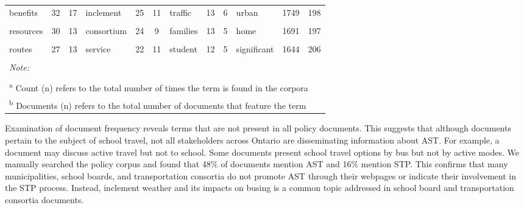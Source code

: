 \documentclass[]{elsarticle} %
\begin{document}
\begin{table}
{\begin{tabular}[t]{lcclcclcclcc}
benefits & 32 & 17 & inclement & 25 & 11 & traffic & 13 & 6 & urban & 1749 & 198\\
\addlinespace
\cellcolor{gray!6}{play} & \cellcolor{gray!6}{31} & \cellcolor{gray!6}{2} & \cellcolor{gray!6}{eligibility} & \cellcolor{gray!6}{24} & \cellcolor{gray!6}{11} & \cellcolor{gray!6}{support} & \cellcolor{gray!6}{13} & \cellcolor{gray!6}{6} & \cellcolor{gray!6}{different} & \cellcolor{gray!6}{1695} & \cellcolor{gray!6}{213}\\
resources & 30 & 13 & consortium & 24 & 9 & families & 13 & 5 & home & 1691 & 197\\
\cellcolor{gray!6}{healthy} & \cellcolor{gray!6}{29} & \cellcolor{gray!6}{16} & \cellcolor{gray!6}{region} & \cellcolor{gray!6}{23} & \cellcolor{gray!6}{10} & \cellcolor{gray!6}{way} & \cellcolor{gray!6}{12} & \cellcolor{gray!6}{5} & \cellcolor{gray!6}{social} & \cellcolor{gray!6}{1672} & \cellcolor{gray!6}{189}\\
routes & 27 & 13 & service & 22 & 11 & student & 12 & 5 & significant & 1644 & 206\\
\cellcolor{gray!6}{lanes} & \cellcolor{gray!6}{26} & \cellcolor{gray!6}{3} & \cellcolor{gray!6}{•} & \cellcolor{gray!6}{21} & \cellcolor{gray!6}{1} & \cellcolor{gray!6}{region} & \cellcolor{gray!6}{12} & \cellcolor{gray!6}{4} & \cellcolor{gray!6}{mobility} & \cellcolor{gray!6}{1634} & \cellcolor{gray!6}{136}\\
\bottomrule
\multicolumn{12}{l}{\rule{0pt}{1em}\textit{Note: }}\\
\multicolumn{12}{l}{\rule{0pt}{1em} }\\
\multicolumn{12}{l}{\rule{0pt}{1em}\textsuperscript{a} Count (n) refers to the total number of times the term is found in the corpora}\\
\multicolumn{12}{l}{\rule{0pt}{1em}\textsuperscript{b} Documents (n) refers to the total number of documents that feature the term}\\
\end{tabular}}
\end{table}

Examination of document frequency reveals terms that are not present in
all policy documents. This suggests that although documents pertain to
the subject of school travel, not all stakeholders across Ontario are
disseminating information about AST. For example, a document may discuss
active travel but not to school. Some documents present school travel
options by bus but not by active modes. We manually searched the policy
corpus and found that 48\% of documents mention AST and 16\% mention
STP. This confirms that many municipalities, school boards, and
transportation consortia do not promote AST through their webpages or
indicate their involvement in the STP process. Instead, inclement
weather and its impacts on busing is a common topic addressed in school
board and transportation consortia documents.
\end{document}
